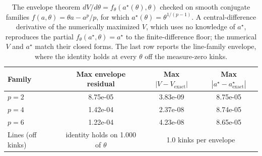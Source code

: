 \begin{table}[h]
\centering
\caption{The envelope theorem $dV/d\theta = f_\theta(a^\star(\theta),\theta)$ checked on smooth conjugate families $f(a,\theta)=\theta a - a^p/p$, for which $a^\star(\theta)=\theta^{1/(p-1)}$. A central-difference derivative of the numerically maximized $V$, which uses no knowledge of $a^\star$, reproduces the partial $f_\theta(a^\star,\theta)=a^\star$ to the finite-difference floor; the numerical $V$ and $a^\star$ match their closed forms. The last row reports the line-family envelope, where the identity holds at every $\theta$ off the measure-zero kinks.}
\label{tab:prelim_envelope}
\begin{tabular}{lccc}
\hline
Family & Max envelope residual & Max $|V-V_{\mathrm{exact}}|$ & Max $|a^\star - a^\star_{\mathrm{exact}}|$ \\
\hline
$p=2$ & 8.75e-05 & 3.83e-09 & 8.75e-05 \\
$p=4$ & 1.42e-04 & 2.37e-08 & 8.74e-05 \\
$p=6$ & 1.22e-04 & 4.23e-08 & 8.65e-05 \\
\hline
Lines (off kinks) & identity holds on 1.000 of $\theta$ & \multicolumn{2}{c}{1.0 kinks per envelope} \\
\hline
\end{tabular}
\end{table}
